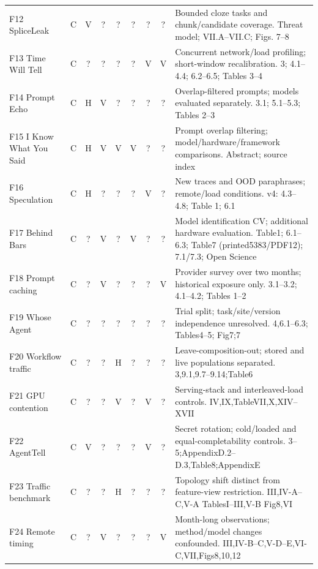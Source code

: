 \begin{table}[p]
\begin{tabularx}{\textwidth}{@{}p{}cccccccY@{}}
F12 SpliceLeak~\cite{spliceleak2026} & C & V & ? & ? & ? & ? & ? & Bounded cloze tasks and chunk/candidate coverage. Threat model; VII.A--VII.C; Figs. 7--8\\
F13 Time Will Tell~\cite{timewilltell2024} & C & ? & ? & ? & ? & V & V & Concurrent network/load profiling; short-window recalibration. 3; 4.1--4.4; 6.2--6.5; Tables 3--4\\
F14 Prompt Echo~\cite{prompt_echo2026} & C & H & V & ? & ? & ? & ? & Overlap-filtered prompts; models evaluated separately. 3.1; 5.1--5.3; Tables 2--3\\
F15 I Know What You Said~\cite{gao2025iknow} & C & H & V & V & V & ? & ? & Prompt overlap filtering; model/hardware/framework comparisons. Abstract; source index\\
F16 Speculation~\cite{wei2024speculation} & C & H & ? & ? & ? & V & ? & New traces and OOD paraphrases; remote/load conditions. v4: 4.3--4.8; Table 1; 6.1\\
F17 Behind Bars~\cite{gu2026behindbars} & C & ? & V & ? & V & ? & ? & Model identification CV; additional hardware evaluation. Table1; 6.1--6.3; Table7 (printed5383/PDF12); 7.1/7.3; Open Science\\
F18 Prompt caching~\cite{gu2025promptcaching} & C & ? & V & ? & ? & ? & V & Provider survey over two months; historical exposure only. 3.1--3.2; 4.1--4.2; Tables 1--2\\
F19 Whose Agent~\cite{kang2026whoseagent} & C & ? & ? & ? & ? & ? & ? & Trial split; task/site/version independence unresolved. 4,6.1--6.3; Tables4--5; Fig7;7\\
F20 Workflow traffic~\cite{dangol2026workflow} & C & ? & ? & H & ? & ? & ? & Leave-composition-out; stored and live populations separated. 3,9.1,9.7--9.14;Table6\\
F21 GPU contention~\cite{abubakar2026contention} & C & ? & ? & V & ? & V & ? & Serving-stack and interleaved-load controls. IV,IX,TableVII,X,XIV--XVII\\
F22 AgentTell~\cite{shahriar2026agenttell} & C & V & ? & ? & ? & V & ? & Secret rotation; cold/loaded and equal-completability controls. 3--5;AppendixD.2--D.3,Table8;AppendixE\\
F23 Traffic benchmark~\cite{pouryousef2026traffic} & C & ? & ? & H & ? & ? & ? & Topology shift distinct from feature-view restriction. III,IV-A--C,V-A TablesI--III,V-B Fig8,VI\\
F24 Remote timing~\cite{carlini2024remote} & C & ? & V & ? & ? & ? & V & Month-long observations; method/model changes confounded. III,IV-B--C,V-D--E,VI-C,VII,Figs8,10,12\\

\end{tabularx}
\end{table}
